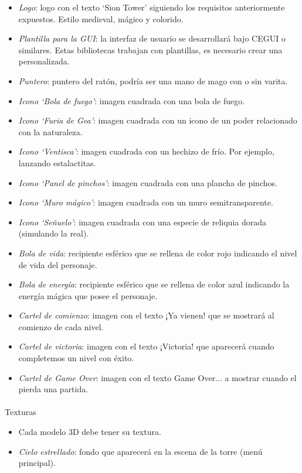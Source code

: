 \begin{itemize}
    \item \emph{Logo}: logo con el texto `Sion Tower' siguiendo los requisitos
    anteriormente expuestos. Estilo medieval, mágico y colorido.
    \item \emph{Plantilla para la GUI}: la interfaz de usuario se desarrollará
    bajo CEGUI o similares. Estas bibliotecas trabajan con plantillas,
    es necesario crear una personalizada.
    \item \emph{Puntero}: puntero del ratón, podría ser una mano de mago
    con o sin varita.
    \item \emph{Icono `Bola de fuego'}: imagen cuadrada con una bola de fuego.
    \item \emph{Icono `Furia de Gea'}: imagen cuadrada con un icono de un
    poder relacionado con la naturaleza.
    \item \emph{Icono `Ventisca'}: imagen cuadrada con un hechizo de frío.
    Por ejemplo, lanzando estalactitas.
    \item \emph{Icono `Panel de pinchos'}: imagen cuadrada con una plancha
    de pinchos.
    \item \emph{Icono `Muro mágico'}: imagen cuadrada con un muro semitransparente.
    \item \emph{Icono `Señuelo'}: imagen cuadrada con una especie de reliquia
    dorada (simulando la real).
    \item \emph{Bola de vida}: recipiente esférico que se rellena de color
    rojo indicando el nivel de vida del personaje.
    \item \emph{Bola de energía}: recipiente esférico que se rellena de color
    azul indicando la energía mágica que posee el personaje.
    \item \emph{Cartel de comienzo}: imagen con el texto ¡Ya vienen! que
    se mostrará al comienzo de cada nivel.
    \item \emph{Cartel de victoria}: imagen con el texto ¡Victoria! que
    aparecerá cuando completemos un nivel con éxito.
    \item \emph{Cartel de Game Over}: imagen con el texto Game Over...
    a mostrar cuando el \jugador pierda una partida.
\end{itemize}

\paragraph{}
Texturas

\begin{itemize}
    \item Cada modelo 3D debe tener su textura.
    \item \emph{Cielo estrellado}: fondo que aparecerá en la escena de la torre
    (menú principal).
\end{itemize}

